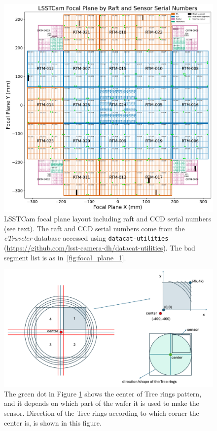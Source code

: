 \documentclass[CTN,authoryear,toc]{lsstdoc}
\begin{document}
\begin{figure}
  \centering
  \includegraphics[width=\textwidth]{figures/LSSTCam_focal_plane_CTN_001_FIG2.pdf}
	\caption{LSSTCam focal plane layout including raft and CCD serial numbers (see text). The raft and CCD serial numbers come from the \emph{eTraveler} database accessed using {\tt{datacat-utilities}} (\url{https://github.com/lsst-camera-dh/datacat-utilities}). The bad segment list is as in~\ref{fig:focal_plane_1}.}
  \label{fig:focal_plane_2}
\end{figure}

\clearpage

\begin{figure}
  \centering
  \includegraphics[width=\textwidth]{figures/TR_center_direction.png}
	\caption{The green dot in Figure \ref{fig:focal_plane_2} shows the center of Tree rings pattern, and it depends on which part of the wafer it is used to make the sensor. Direction of the Tree rings according to which corner the center is, is shown in this figure.}
  \label{fig:TR_direction_center}
\end{figure}
\end{document}
